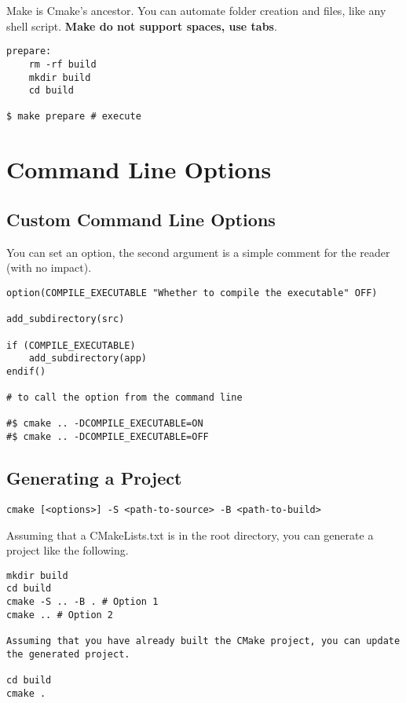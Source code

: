 Make is Cmake's ancestor. You can automate folder creation and files,
like any shell script.
\textbf{Make do not support spaces, use tabs}.

\begin{verbatim}
prepare:
    rm -rf build
    mkdir build
    cd build

$ make prepare # execute 
\end{verbatim}

\section{Command Line Options}

\subsection{Custom Command Line Options}

You can set an option,
the second argument is a simple comment for the reader (with no impact).

\begin{verbatim}
option(COMPILE_EXECUTABLE "Whether to compile the executable" OFF)

add_subdirectory(src)

if (COMPILE_EXECUTABLE)
    add_subdirectory(app)
endif()

# to call the option from the command line

#$ cmake .. -DCOMPILE_EXECUTABLE=ON
#$ cmake .. -DCOMPILE_EXECUTABLE=OFF
\end{verbatim}


\subsection{Generating a Project}

\begin{verbatim}
cmake [<options>] -S <path-to-source> -B <path-to-build>
\end{verbatim}

Assuming that a CMakeLists.txt is in the root directory, you can generate a project like the following.

\begin{verbatim}
mkdir build
cd build
cmake -S .. -B . # Option 1
cmake .. # Option 2

Assuming that you have already built the CMake project, you can update the generated project.

cd build
cmake .
\end{verbatim}

